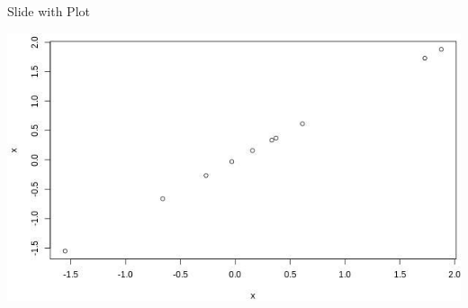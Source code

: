 \documentclass[ignorenonframetext,]{beamer}
\begin{document}
\begin{frame}{Slide with Plot}
\protect\hypertarget{slide-with-plot}{}

\scriptsize\includegraphics{example_files/figure-beamer/unnamed-chunk-3-1.jpeg}

\end{frame}

\end{document}
